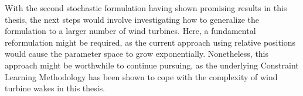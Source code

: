 With the second stochastic formulation having shown promising results in this thesis, the next steps would involve investigating how to generalize the formulation to a larger number of wind turbines. Here, a fundamental reformulation might be required, as the current approach using relative positions would cause the parameter space to grow exponentially. Nonetheless, this approach might be worthwhile to continue pursuing, as the underlying Constraint Learning Methodology has been shown to cope with the complexity of wind turbine wakes in this thesis.